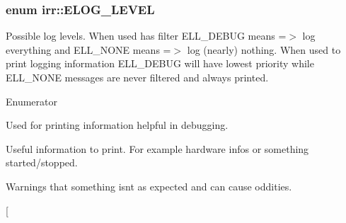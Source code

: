 \subsubsection[{\texorpdfstring{E\+L\+O\+G\+\_\+\+L\+E\+V\+EL}{ELOG\_LEVEL}}]{\setlength{\rightskip}{0pt plus 5cm}enum {\bf irr\+::\+E\+L\+O\+G\+\_\+\+L\+E\+V\+EL}}\hypertarget{namespaceirr_aa2d1cac68606a25ed24cfffccfa30a92}{}\label{namespaceirr_aa2d1cac68606a25ed24cfffccfa30a92}
Possible log levels. When used has filter E\+L\+L\+\_\+\+D\+E\+B\+UG means =$>$ log everything and E\+L\+L\+\_\+\+N\+O\+NE means =$>$ log (nearly) nothing. When used to print logging information E\+L\+L\+\_\+\+D\+E\+B\+UG will have lowest priority while E\+L\+L\+\_\+\+N\+O\+NE messages are never filtered and always printed. \begin{Desc}
\item[Enumerator]\par
\begin{description}
\item[{\em 
E\+L\+L\+\_\+\+D\+E\+B\+UG\hypertarget{namespaceirr_aa2d1cac68606a25ed24cfffccfa30a92a58d2a62ce004018e8bb6a29c732c70e3}{}\label{namespaceirr_aa2d1cac68606a25ed24cfffccfa30a92a58d2a62ce004018e8bb6a29c732c70e3}
}]Used for printing information helpful in debugging. \item[{\em 
E\+L\+L\+\_\+\+I\+N\+F\+O\+R\+M\+A\+T\+I\+ON\hypertarget{namespaceirr_aa2d1cac68606a25ed24cfffccfa30a92a9d74de15737e326a91aec6f38c23f9cf}{}\label{namespaceirr_aa2d1cac68606a25ed24cfffccfa30a92a9d74de15737e326a91aec6f38c23f9cf}
}]Useful information to print. For example hardware infos or something started/stopped. \item[{\em 
E\+L\+L\+\_\+\+W\+A\+R\+N\+I\+NG\hypertarget{namespaceirr_aa2d1cac68606a25ed24cfffccfa30a92ad3d7f6bdd2f842cfc17561ba4be95001}{}\label{namespaceirr_aa2d1cac68606a25ed24cfffccfa30a92ad3d7f6bdd2f842cfc17561ba4be95001}
}]Warnings that something isn\textquotesingle{}t as expected and can cause oddities. \item[{\em 
}
\end{description}
\end{Desc}
